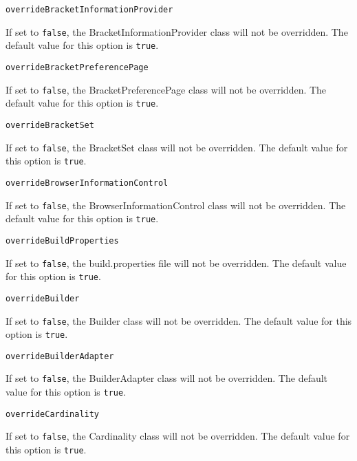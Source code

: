 \noindent\texttt{overrideBracketInformationProvider}
\begin{myindentpar}{1cm}
If set to \texttt{false}, the BracketInformationProvider class will not be overridden. The default value for this option is \texttt{true}.
\end{myindentpar}

\noindent\texttt{overrideBracketPreferencePage}
\begin{myindentpar}{1cm}
If set to \texttt{false}, the BracketPreferencePage class will not be overridden. The default value for this option is \texttt{true}.
\end{myindentpar}

\noindent\texttt{overrideBracketSet}
\begin{myindentpar}{1cm}
If set to \texttt{false}, the BracketSet class will not be overridden. The default value for this option is \texttt{true}.
\end{myindentpar}

\noindent\texttt{overrideBrowserInformationControl}
\begin{myindentpar}{1cm}
If set to \texttt{false}, the BrowserInformationControl class will not be overridden. The default value for this option is \texttt{true}.
\end{myindentpar}

\noindent\texttt{overrideBuildProperties}
\begin{myindentpar}{1cm}
If set to \texttt{false}, the build.properties file will not be overridden. The default value for this option is \texttt{true}.
\end{myindentpar}

\noindent\texttt{overrideBuilder}
\begin{myindentpar}{1cm}
If set to \texttt{false}, the Builder class will not be overridden. The default value for this option is \texttt{true}.
\end{myindentpar}

\noindent\texttt{overrideBuilderAdapter}
\begin{myindentpar}{1cm}
If set to \texttt{false}, the BuilderAdapter class will not be overridden. The default value for this option is \texttt{true}.
\end{myindentpar}

\noindent\texttt{overrideCardinality}
\begin{myindentpar}{1cm}
If set to \texttt{false}, the Cardinality class will not be overridden. The default value for this option is \texttt{true}.
\end{myindentpar}


